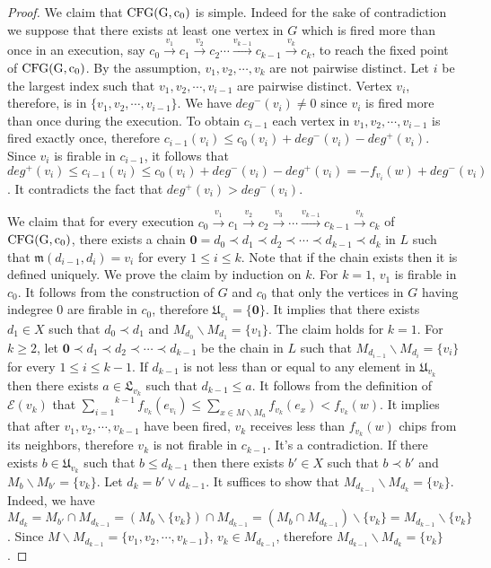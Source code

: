 \documentclass{article}
\theoremstyle{definition}
\newcommand\down[1]{e_{#1}}
\newcommand\set[1]{\{ #1 \}}
\begin{document}
\begin{proof}
We claim that ${\rm CFG(G,c_0)}$ is simple. Indeed for the sake of contradiction we suppose that there exists at least one vertex in $G$ which is fired more than once in an execution, say $c_0 \overset{v_1}{\to}c_1\overset{v_2}{\to}c_2\cdots\overset{v_{k-1}}{\to}c_{k-1}\overset{v_k}{\to}c_k$, to reach the fixed point  of ${\rm CFG(G,c_0)}$. By the assumption, $v_1,v_2,\cdots,v_k$ are not pairwise distinct. Let $i$ be the largest index such that $v_1,v_2,\cdots,v_{i-1}$ are pairwise distinct. Vertex $v_i$, therefore, is in $\set{v_1,v_2,\cdots,v_{i-1}}$. We have $deg^{-}(v_i)\neq 0$ since $v_i$ is fired more than once during the execution. To obtain $c_{i-1}$ each vertex in $v_1,v_2,\cdots,v_{i-1}$ is fired exactly once, therefore $c_{i-1}(v_i)\leq c_0(v_i)+deg^{-}(v_i)-deg^{+}(v_i)$. Since $v_i$ is firable in $c_{i-1}$, it follows that $deg^{+}(v_i)\leq c_{i-1}(v_i)\leq c_0 (v_i)+deg^{-}(v_i)-deg^{+}(v_i)=-f_{v_i}(w)+deg^{-}(v_i)$. It contradicts the fact that $deg^{+}(v_i)>deg^{-}(v_i)$.

We claim that for every execution $c_0\overset{v_1}{\to}c_1\overset{v_2}{\to}c_2\overset{v_3}{\to}\cdots\overset{v_{k-1}}{\to}c_{k-1}\overset{v_k}{\to}c_k$ of ${\rm CFG(G,c_0)}$, there exists a chain $\textbf{0}=d_0\prec d_1\prec d_2\prec \cdots \prec d_{k-1} \prec d_k$ in $L$ such that $\mathfrak{m}(d_{i-1},d_{i})=v_i$ for every $1 \leq i\leq k$. Note that if the chain exists then it is defined uniquely. We prove the claim by induction on $k$. For $k=1$, $v_1$ is firable in $c_0$. It follows from the construction of $G$ and $c_0$ that only the vertices in $G$ having indegree 0 are firable in $c_0$, therefore $\mathfrak{U}_{v_1}=\set{\textbf{0}}$. It implies that there exists $d_1 \in X$ such that $d_0 \prec d_1$ and $M_{d_0}\backslash M_{d_1}=\set{v_1}$. The claim holds for $k=1$. For $k\geq 2$, let $\textbf{0}\prec d_1\prec d_2\prec \cdots \prec d_{k-1}$ be the chain in $L$ such that $M_{d_{i-1}}\backslash M_{d_i}=\set{v_i}$ for every $1 \leq i \leq k-1$. If $d_{k-1}$ is not less than or equal to any element in $\mathfrak{U}_{v_k}$ then there exists $a \in \mathfrak{L}_{v_k}$ such that $d_{k-1} \leq a$. It follows from the definition of $\mathcal{E}(v_k)$ that $\overset{k-1}{\underset{i=1 }{\sum}}f_{v_k}(\down{v_i})\leq \underset{x \in M\backslash M_a}{\sum}f_{v_k}(\down{x})<f_{v_k}(w)$. It implies that after $v_1,v_2,\cdots,v_{k-1}$ have been fired, $v_k$ receives less than $f_{v_k}(w)$ chips from its neighbors, therefore $v_k$ is not firable in $c_{k-1}$. It's a contradiction. If there exists $b \in \mathfrak{U}_{v_k}$ such that $b\leq d_{k-1}$ then there exists $b' \in X$ such that $b \prec b'$ and $M_b\backslash M_{b'}=\set{v_k}$. Let $d_k=b'\lor d_{k-1}$. It suffices to show that $M_{d_{k-1}}\backslash M_{d_k}=\set{v_k}$. Indeed, we have $M_{d_k}=M_{b'}\cap M_{d_{k-1}}=(M_b \backslash \set{v_k})\cap M_{d_{k-1}}=(M_b\cap M_{d_{k-1}})\backslash \set{v_k}=M_{d_{k-1}}\backslash \set{v_k}$. Since $M\backslash M_{d_{k-1}}=\set{v_1,v_2,\cdots,v_{k-1}}$, $v_k \in M_{d_{k-1}}$, therefore $M_{d_{k-1}}\backslash M_{d_k}=\set{v_k}$.


\end{proof}
\end{document}
